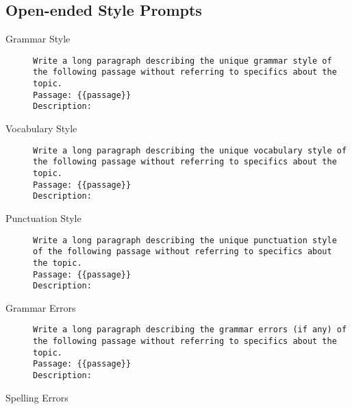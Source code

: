 \subsection{Open-ended Style Prompts}
\label{sec:appendix:openPrompts}
\begin{description}
  \item[Grammar Style]\leavevmode \newline
        \begin{minipage}{\linewidth}
          \begin{lstlisting}
Write a long paragraph describing the unique grammar style of the following passage without referring to specifics about the topic.
Passage: {{passage}}
Description:
\end{lstlisting}
        \end{minipage}
  \item[Vocabulary Style]\leavevmode \newline
        \begin{minipage}{\linewidth}
          \begin{lstlisting}
Write a long paragraph describing the unique vocabulary style of the following passage without referring to specifics about the topic.
Passage: {{passage}}
Description:
\end{lstlisting}
        \end{minipage}
  \item[Punctuation Style]\leavevmode \newline
        \begin{minipage}{\linewidth}
          \begin{lstlisting}
Write a long paragraph describing the unique punctuation style of the following passage without referring to specifics about the topic.
Passage: {{passage}}
Description:
\end{lstlisting}
        \end{minipage}
  \item[Grammar Errors]\leavevmode \newline
        \begin{minipage}{\linewidth}
          \begin{lstlisting}
Write a long paragraph describing the grammar errors (if any) of the following passage without referring to specifics about the topic.
Passage: {{passage}}
Description:
\end{lstlisting}
        \end{minipage}
  \item[Spelling Errors]\leavevmode \newline

\end{description}
